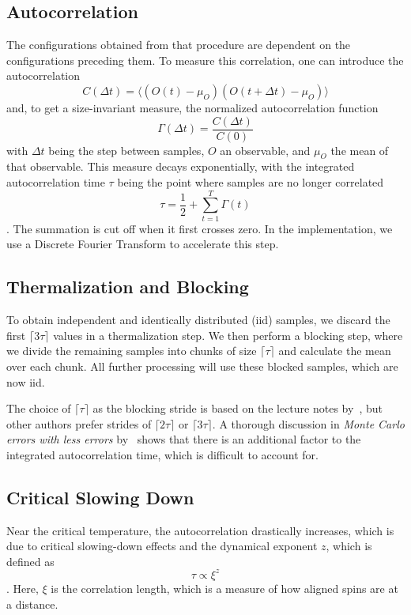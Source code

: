 	\subsection{Autocorrelation}
		The configurations obtained from that procedure are dependent on the configurations preceding them.  To measure this correlation, one can introduce the autocorrelation
		\begin{equation}
			C(\Delta t) = \langle(O(t) - \mu_O)(O(t + \Delta t) - \mu_O) \rangle
		\end{equation}
		\cite[eq. 41]{bootstrap} and, to get a size-invariant measure, the normalized autocorrelation function
		\begin{equation}
			\Gamma(\Delta t) = \frac{C(\Delta t)}{C(0)}
		\end{equation}
		\cite[eq. 43]{bootstrap} with $\Delta t$ being the step between samples, $O$ an observable, and $\mu_O$ the mean of that observable. This measure decays exponentially, with the integrated autocorrelation time $\tau$ being the point where samples are no longer correlated
		\begin{equation}
			\tau = \frac{1}{2} + \sum^{T}_{t=1}{\Gamma(t)}
		\end{equation}
		\cite[eq. 46]{bootstrap}. The summation is cut off when it first crosses zero. In the implementation, we use a Discrete Fourier Transform to accelerate this step.
		
	\subsection{Thermalization and Blocking}\label{sec:blocking}
		To obtain independent and identically distributed (iid) samples, we discard the first $\lceil 3\tau \rceil$ values in a thermalization step. We then perform a blocking step, where we divide the remaining samples into chunks of size $\lceil \tau \rceil$ and calculate the mean over each chunk. All further processing will use these blocked samples, which are now iid.
		
		The choice of $\lceil \tau \rceil$ as the blocking stride is based on the lecture notes by~\citet{bootstrap}, but other authors prefer strides of $\lceil 2\tau \rceil$ or $\lceil 3\tau \rceil$. A thorough discussion in \emph{Monte Carlo errors with less errors} by~\citet{monte_carlo_errors} shows that there is an additional factor to the integrated autocorrelation time, which is difficult to account for.
		
	\subsection{Critical Slowing Down}\label{sec:theo:critical_slowing_down}
		Near the critical temperature, the autocorrelation drastically increases, which is due to critical slowing-down effects and the dynamical exponent $z$, which is defined as
		\begin{equation}
			\tau \propto \xi^z
		\end{equation}
		\cite[eq. (6)]{bootstrap}. Here, $\xi$ is the correlation length, which is a measure of how aligned spins are at a distance.
		
